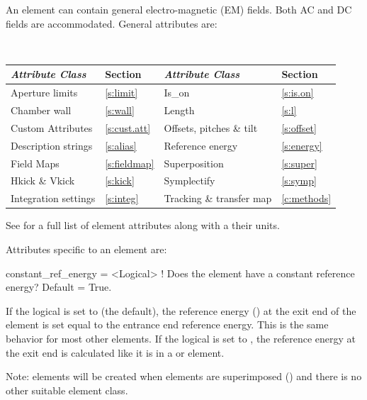 An  element can contain general electro-magnetic (EM)
fields. Both AC and DC fields are accommodated.  General 
attributes are:
\begin{center}
\tt
\begin{tabular}{llll} \toprule
  {\sl Attribute Class}      & Section           & {\sl Attribute Class}      & Section         \\ \midrule
  Aperture limits            & \ref{s:limit}     & Is_on                      & \ref{s:is.on}   \\
  Chamber wall               & \ref{s:wall}      & Length                     & \ref{s:l}       \\ 
  Custom Attributes          & \ref{s:cust.att}  & Offsets, pitches \& tilt   & \ref{s:offset}  \\
  Description strings        & \ref{s:alias}     & Reference energy           & \ref{s:energy}  \\
  Field Maps                 & \ref{s:fieldmap}  & Superposition              & \ref{s:super}   \\
  Hkick \& Vkick             & \ref{s:kick}      & Symplectify                & \ref{s:symp}    \\
  Integration settings       & \ref{s:integ}     & Tracking \& transfer map   & \ref{c:methods} \\
  \bottomrule
\end{tabular}
\end{center}
\toffset
See  for a full list of element attributes along with a their units.

Attributes specific to an  element are:
\begin{example}
  constant_ref_energy = <Logical> ! Does the element have a constant reference energy? Default = True.
\end{example}

If the  logical is set to  (the default), the reference energy
() at the exit end of the element is set equal to the entrance end reference
energy. This is the same behavior for most other elements. If the  logical
is set to , the reference energy at the exit end is calculated like it is in a
 or  element.

Note:  elements will be created when elements are superimposed () and there is
no other suitable element class.

